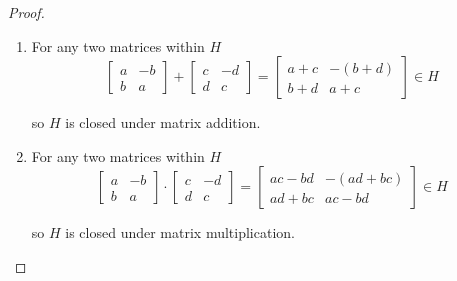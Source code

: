 \begin{proof}
    \begin{enumerate}[label={\textbf{\alph*}}]
        \item For any two matrices within $H$
              \[
                  \begin{bmatrix}
                      a & -b \\
                      b & a
                  \end{bmatrix}
                  +
                  \begin{bmatrix}
                      c & -d \\
                      d & c
                  \end{bmatrix}
                  =
                  \begin{bmatrix}
                      a + c & -(b + d) \\
                      b + d & a + c
                  \end{bmatrix}
                  \in H
              \]

              so $H$ is closed under matrix addition.
        \item For any two matrices within $H$
              \[
                  \begin{bmatrix}
                      a & -b \\
                      b & a
                  \end{bmatrix}
                  \cdot
                  \begin{bmatrix}
                      c & -d \\
                      d & c
                  \end{bmatrix}
                  =
                  \begin{bmatrix}
                      ac - bd & -(ad + bc) \\
                      ad + bc & ac - bd
                  \end{bmatrix}
                  \in H
              \]

              so $H$ is closed under matrix multiplication.
    \end{enumerate}
\end{proof}

